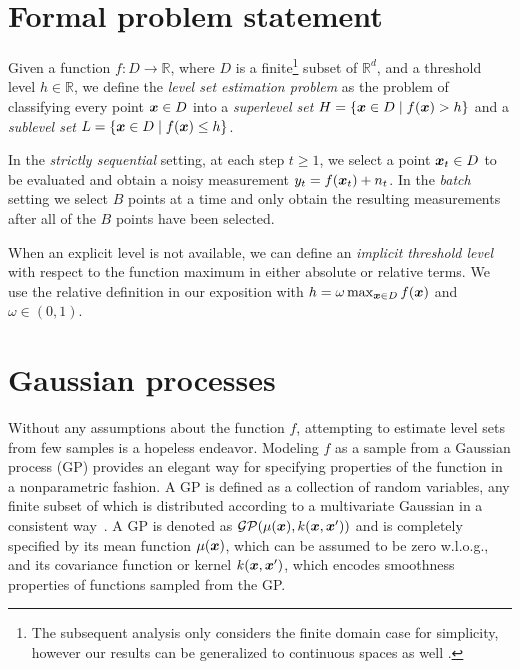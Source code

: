 \section{Formal problem statement} \label{sect:prelim}

Given a function ${f : D \to \mathbb{R}}$, where $D$ is a
finite\footnote{The subsequent analysis only considers the finite domain case
for simplicity, however our results can be generalized to continuous spaces
as well \citep[cf.][]{srinivas10}.}
subset of $\mathbb{R}^d$, and a threshold level ${h \in \mathbb{R}}$,
we define the \emph{level set estimation problem} as the problem of classifying
every point $\bm{x} \in D$ into a \emph{superlevel set}
${H = \{\bm{x} \in D \mid f(\bm{x}) > h\}}$ and a \emph{sublevel set}
${L = \{\bm{x} \in D \mid f(\bm{x}) \leq h\}}$.

In the \emph{strictly sequential} setting,
at each step $t \geq 1$, we select a point $\bm{x}_t \in D$ to be evaluated and
obtain a noisy measurement $y_t = f(\bm{x}_t) + n_t$.
In the \emph{batch} setting we select $B$ points at a time and only obtain
the resulting measurements after all of the $B$ points have been selected.

When an explicit level is not available, we can define an
\emph{implicit threshold level}
with respect to the function maximum in either absolute or relative terms.
We use the relative definition in our exposition with
${h = \omega \max_{\bm{x}\in D} f(\bm{x})}$
and $\omega \in (0, 1)$.

\section{Gaussian processes}
 Without any assumptions about the function $f$, attempting to estimate level sets from few samples is a hopeless endeavor.
Modeling $f$ as a sample from a Gaussian process
(GP) provides an elegant way for specifying properties of the function in a
nonparametric fashion. A GP is defined as a collection of random variables,
any finite subset of which is distributed according to a
multivariate Gaussian in a consistent way~\cite{rasmussen06}. A GP is
denoted as $\mathcal{GP}(\mu(\bm{x}), k(\bm{x}, \bm{x}'))$ and is
completely specified by its mean function $\mu(\bm{x})$, which can be
assumed to be zero w.l.o.g., and its covariance function or kernel
$k(\bm{x}, \bm{x}')$, which encodes smoothness properties of functions sampled
from the GP.

